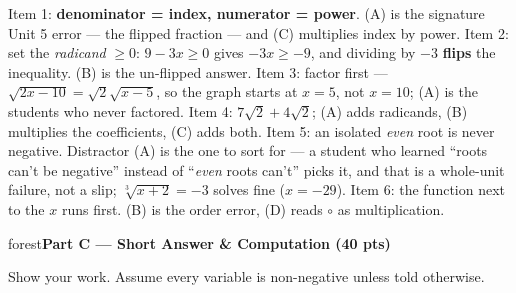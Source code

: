 \documentclass[10pt]{article}
\newcommand{\parthead}[1]{%
  \vspace{6pt}\noindent
  \begin{headlinebox}{forest}\color{white}\bfseries #1\end{headlinebox}%
  \vspace{4pt}}
\begin{document}
\begin{teachernote}
Item 1: \textbf{denominator = index, numerator = power}. (A) is the signature Unit 5 error --- the
flipped fraction --- and (C) multiplies index by power. Item 2: set the \emph{radicand} $\ge0$:
$9-3x\ge0$ gives $-3x\ge-9$, and dividing by $-3$ \textbf{flips} the inequality. (B) is the
un-flipped answer. Item 3: factor first --- $\sqrt{2x-10}=\sqrt2\sqrt{x-5}$, so the graph starts at
$x=5$, not $x=10$; (A) is the students who never factored. Item 4: $7\sqrt2+4\sqrt2$; (A) adds
radicands, (B) multiplies the coefficients, (C) adds both. Item 5: an isolated \emph{even} root is
never negative. Distractor (A) is the one to sort for --- a student who learned ``roots can't be
negative'' instead of ``\emph{even} roots can't'' picks it, and that is a whole-unit failure, not a
slip; $\sqrt[3]{x+2}=-3$ solves fine ($x=-29$). Item 6: the function next to the $x$ runs first. (B)
is the order error, (D) reads $\circ$ as multiplication.
\end{teachernote}

\parthead{Part C --- Short Answer \& Computation (40 pts)}
Show your work. Assume every variable is non-negative unless told otherwise.
\end{document}
